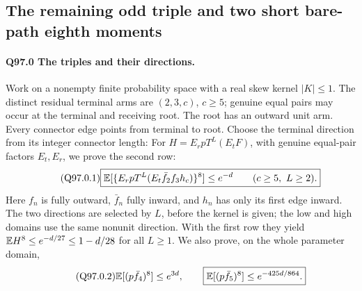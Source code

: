 \subsection{The remaining odd triple and two short bare-path eighth moments}\label{proof:Q5-C097}

\paragraph{Q97.0 The triples and their directions.}
Work on a nonempty finite probability space with a real skew kernel
\(|K|\le\allowbreak 1\). The distinct residual terminal arms are \((2,\allowbreak 3,\allowbreak c)\),
\(c\ge\allowbreak 5\); genuine equal pairs may occur at the terminal and receiving
root. The root has an outward unit arm. Every connector edge points
from terminal to root. Choose the terminal direction from its integer
connector length:
For \(H=\allowbreak E_rpT^L(E_tF)\), with genuine equal-pair factors \(E_t,\allowbreak E_r\),
we prove the second row:
\begin{equation}\tag{Q97.0.1}\label{eq:Q97:0.1}
\boxed{\mathbb E[\{E_rpT^L(E_t\bar f_2f_3h_c)\}^8]\le e^{-d}
\qquad(c\ge5,\ L\ge2).}
\end{equation}
Here \(f_n\) is fully outward, \(\bar f_n\) fully inward, and
\(h_n\) has only its first edge inward. The two directions are selected
by \(L\), before the kernel is given; the low and high domains use the
same nonunit direction. With the first row they yield
\(\mathbb E H^8\le\allowbreak  e^{-d/27}\le\allowbreak 1-d/28\) for all \(L\ge\allowbreak 1\).
We also prove, on the whole parameter domain,
\begin{equation}\tag{Q97.0.2}\label{eq:Q97:0.2}
\mathbb E[(p\bar f_4)^8]\le e^{3d},\qquad
\boxed{\mathbb E[(p\bar f_5)^8]\le e^{-425d/864}.}
\end{equation}

